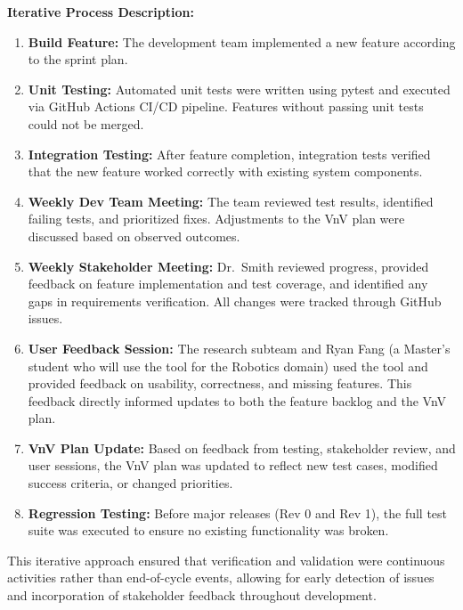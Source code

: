 \documentclass[12pt, titlepage]{article}
\begin{document}
\textbf{Iterative Process Description:}
\begin{enumerate}
  \item \textbf{Build Feature:} The development team implemented a new feature according to the sprint plan.

  \item \textbf{Unit Testing:} Automated unit tests were written using pytest and executed via GitHub Actions CI/CD pipeline. Features without passing unit tests could not be merged.

  \item \textbf{Integration Testing:} After feature completion, integration tests verified that the new feature worked correctly with existing system components.

  \item \textbf{Weekly Dev Team Meeting:} The team reviewed test results, identified failing tests, and prioritized fixes. Adjustments to the VnV plan were discussed based on observed outcomes.

  \item \textbf{Weekly Stakeholder Meeting:} Dr.~Smith reviewed progress, provided feedback on feature implementation and test coverage, and identified any gaps in requirements verification. All changes were tracked through GitHub issues.

  \item \textbf{User Feedback Session:} The research subteam and Ryan Fang (a Master's student who will use the tool for the Robotics domain) used the tool and provided feedback on usability, correctness, and missing features. This feedback directly informed updates to both the feature backlog and the VnV plan.

  \item \textbf{VnV Plan Update:} Based on feedback from testing, stakeholder review, and user sessions, the VnV plan was updated to reflect new test cases, modified success criteria, or changed priorities.

  \item \textbf{Regression Testing:} Before major releases (Rev 0 and Rev 1), the full test suite was executed to ensure no existing functionality was broken.
\end{enumerate}

This iterative approach ensured that verification and validation were continuous activities rather than end-of-cycle events, allowing for early detection of issues and incorporation of stakeholder feedback throughout development.
\end{document}
